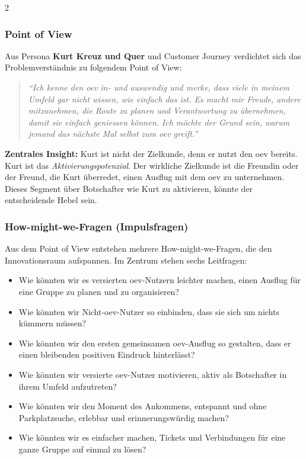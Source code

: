 \newpage
\begin{multicols}{2}

\subsubsection{Point of View}

Aus Persona \textbf{Kurt Kreuz und Quer} und Customer Journey verdichtet sich das Problemverständnis zu folgendem Point of View:

\begin{quote}
\textit{``Ich kenne den \gls{oev} in- und auswendig und merke, dass viele in meinem Umfeld gar nicht wissen, wie einfach das ist.
Es macht mir Freude, andere mitzunehmen, die Route zu planen und Verantwortung zu übernehmen, damit sie einfach geniessen können.
Ich möchte der Grund sein, warum jemand das nächste Mal selbst zum \gls{oev} greift.''}
\end{quote}

\textbf{Zentrales Insight:} Kurt ist nicht der Zielkunde, denn er nutzt den \gls{oev} bereits.
Kurt ist das \emph{Aktivierungspotenzial}.
Der wirkliche Zielkunde ist die Freundin oder der Freund, die Kurt überredet, einen Ausflug mit dem \gls{oev} zu unternehmen.
Dieses Segment über Botschafter wie Kurt zu aktivieren, könnte der entscheidende Hebel sein.

\subsubsection{How-might-we-Fragen (Impulsfragen)}

Aus dem Point of View entstehen mehrere How-might-we-Fragen, die den Innovationsraum aufspannen.
Im Zentrum stehen sechs Leitfragen:

\begin{itemize}
  \item Wie könnten wir es versierten \gls{oev}-Nutzern leichter machen, einen Ausflug für eine Gruppe zu planen und zu organisieren?
  \item Wie könnten wir Nicht-\gls{oev}-Nutzer so einbinden, dass sie sich um nichts kümmern müssen?
  \item Wie könnten wir den ersten gemeinsamen \gls{oev}-Ausflug so gestalten, dass er einen bleibenden positiven Eindruck hinterlässt?
  \item Wie könnten wir versierte \gls{oev}-Nutzer motivieren, aktiv als Botschafter in ihrem Umfeld aufzutreten?
  \item Wie könnten wir den Moment des Ankommens, entspannt und ohne Parkplatzsuche, erlebbar und erinnerungswürdig machen?
  \item Wie könnten wir es einfacher machen, Tickets und Verbindungen für eine ganze Gruppe auf einmal zu lösen?
\end{itemize}


\end{multicols}
